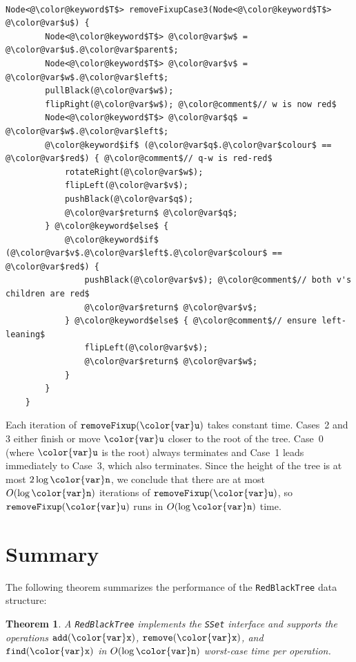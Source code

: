 \documentclass[10pt]{book}
\newcommand{\seclabel}[1]{\label{sec:#1}}
\theoremstyle{plain}
\newtheorem{thm}{Theorem}[chapter]
\theoremstyle{definition}
\begin{document}
 \ \vspace{.5ex}\begin{Verbatim}[gobble=1,tabsize=2,frame=single,framerule=1.2pt,commandchars=\\@\$,label=\texttt{RedBlackTree},labelposition=topline]
	Node<@\color@keyword$T$> removeFixupCase3(Node<@\color@keyword$T$> @\color@var$u$) {
		Node<@\color@keyword$T$> @\color@var$w$ = @\color@var$u$.@\color@var$parent$;
		Node<@\color@keyword$T$> @\color@var$v$ = @\color@var$w$.@\color@var$left$;
		pullBlack(@\color@var$w$);       
		flipRight(@\color@var$w$); @\color@comment$// w is now red$
		Node<@\color@keyword$T$> @\color@var$q$ = @\color@var$w$.@\color@var$left$;
		@\color@keyword$if$ (@\color@var$q$.@\color@var$colour$ == @\color@var$red$) { @\color@comment$// q-w is red-red$
			rotateRight(@\color@var$w$);
			flipLeft(@\color@var$v$);
			pushBlack(@\color@var$q$);
			@\color@var$return$ @\color@var$q$;
		} @\color@keyword$else$ {
			@\color@keyword$if$ (@\color@var$v$.@\color@var$left$.@\color@var$colour$ == @\color@var$red$) {
				pushBlack(@\color@var$v$); @\color@comment$// both v's children are red$
				@\color@var$return$ @\color@var$v$;
			} @\color@keyword$else$ { @\color@comment$// ensure left-leaning$
				flipLeft(@\color@var$v$);
				@\color@var$return$ @\color@var$w$;
			}
		}				
	}
\end{Verbatim}


Each iteration of \ensuremath{\mathtt{removeFixup({\color{var}u})}} takes constant time.  Cases~2 and 3
either finish or move \ensuremath{\mathtt{{\color{var}u}}} closer to the root of the tree.  Case~0 (where
\ensuremath{\mathtt{{\color{var}u}}} is the root) always terminates and Case~1 leads immediately to Case~3,
which also terminates.  Since the height of the tree is at most $2\log
\ensuremath{\mathtt{{\color{var}n}}}$, we conclude that there are at most $O(\log \ensuremath{\mathtt{{\color{var}n}}})$ iterations of
\ensuremath{\mathtt{removeFixup({\color{var}u})}}, so \ensuremath{\mathtt{removeFixup({\color{var}u})}} runs in $O(\log \ensuremath{\mathtt{{\color{var}n}}})$ time.


\section{Summary}
\seclabel{redblack-summary}

The following theorem summarizes the performance of the \texttt{RedBlackTree} data structure:

\begin{thm}
  A \texttt{RedBlackTree} implements the \texttt{SSet} interface and
  supports the operations \ensuremath{\mathtt{add({\color{var}x})}}, \ensuremath{\mathtt{remove({\color{var}x})}}, and \ensuremath{\mathtt{find({\color{var}x})}} in $O(\log
  \ensuremath{\mathtt{{\color{var}n}}})$ worst-case time per operation.
\end{thm}
\end{document}

